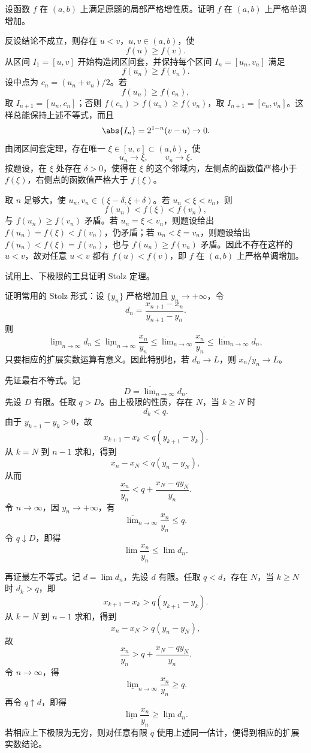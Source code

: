 \begin{xreferenceproblem}[第一组参考题 4]
设函数 $f$ 在 $(a,b)$ 上满足原题的局部严格增性质。证明 $f$ 在 $(a,b)$ 上严格单调增加。
\end{xreferenceproblem}
\begin{xsolution}
反设结论不成立，则存在 $u<v$，$u,v\in(a,b)$，使
\[
  f(u)\geqslant f(v).
\]
从区间 $I_1=[u,v]$ 开始构造闭区间套，并保持每个区间 $I_n=[u_n,v_n]$ 满足
\[
  f(u_n)\geqslant f(v_n).
\]
设中点为 $c_n=(u_n+v_n)/2$。若
\[
  f(u_n)\geqslant f(c_n),
\]
取 $I_{n+1}=[u_n,c_n]$；否则 $f(c_n)>f(u_n)\geqslant f(v_n)$，取 $I_{n+1}=[c_n,v_n]$。这样总能保持上述不等式，而且
\[
  \abs{I_n}=2^{1-n}(v-u)\to0.
\]
由闭区间套定理，存在唯一 $\xi\in[u,v]\subset(a,b)$，使
\[
  u_n\to\xi,\qquad v_n\to\xi.
\]
按题设，在 $\xi$ 处存在 $\delta>0$，使得在 $\xi$ 的这个邻域内，左侧点的函数值严格小于 $f(\xi)$，右侧点的函数值严格大于 $f(\xi)$。

取 $n$ 足够大，使 $u_n,v_n\in(\xi-\delta,\xi+\delta)$。若 $u_n<\xi<v_n$，则
\[
  f(u_n)<f(\xi)<f(v_n),
\]
与 $f(u_n)\geqslant f(v_n)$ 矛盾。若 $u_n=\xi<v_n$，则题设给出 $f(u_n)=f(\xi)<f(v_n)$，仍矛盾；若 $u_n<\xi=v_n$，则题设给出 $f(u_n)<f(\xi)=f(v_n)$，也与 $f(u_n)\geqslant f(v_n)$ 矛盾。因此不存在这样的 $u<v$，故对任意 $u<v$ 都有 $f(u)<f(v)$，即 $f$ 在 $(a,b)$ 上严格单调增加。
\end{xsolution}

\begin{xreferenceproblem}[第一组参考题 5]
试用上、下极限的工具证明 Stolz 定理。
\end{xreferenceproblem}
\begin{xsolution}
证明常用的 Stolz 形式：设 $\{y_n\}$ 严格增加且 $y_n\to+\infty$，令
\[
  d_n=\frac{x_{n+1}-x_n}{y_{n+1}-y_n}.
\]
则
\[
  \underline{\lim}_{n\to\infty}d_n
  \leqslant
  \underline{\lim}_{n\to\infty}\frac{x_n}{y_n}
  \leqslant
  \overline{\lim}_{n\to\infty}\frac{x_n}{y_n}
  \leqslant
  \overline{\lim}_{n\to\infty}d_n,
\]
只要相应的扩展实数运算有意义。因此特别地，若 $d_n\to L$，则 $x_n/y_n\to L$。

先证最右不等式。记
\[
  D=\overline{\lim}_{n\to\infty}d_n.
\]
先设 $D$ 有限。任取 $q>D$。由上极限的性质，存在 $N$，当 $k\geqslant N$ 时
\[
  d_k<q.
\]
由于 $y_{k+1}-y_k>0$，故
\[
  x_{k+1}-x_k<q(y_{k+1}-y_k).
\]
从 $k=N$ 到 $n-1$ 求和，得到
\[
  x_n-x_N<q(y_n-y_N),
\]
从而
\[
  \frac{x_n}{y_n}
  <q+\frac{x_N-qy_N}{y_n}.
\]
令 $n\to\infty$，因 $y_n\to+\infty$，有
\[
  \overline{\lim}_{n\to\infty}\frac{x_n}{y_n}\leqslant q.
\]
令 $q\downarrow D$，即得
\[
  \overline{\lim}\frac{x_n}{y_n}\leqslant\overline{\lim}d_n.
\]

再证最左不等式。记 $d=\underline{\lim}d_n$，先设 $d$ 有限。任取 $q<d$，存在 $N$，当 $k\geqslant N$ 时 $d_k>q$，即
\[
  x_{k+1}-x_k>q(y_{k+1}-y_k).
\]
从 $k=N$ 到 $n-1$ 求和，得到
\[
  x_n-x_N>q(y_n-y_N),
\]
故
\[
  \frac{x_n}{y_n}>q+\frac{x_N-qy_N}{y_n}.
\]
令 $n\to\infty$，得
\[
  \underline{\lim}_{n\to\infty}\frac{x_n}{y_n}\geqslant q.
\]
再令 $q\uparrow d$，即得
\[
  \underline{\lim}\frac{x_n}{y_n}\geqslant\underline{\lim}d_n.
\]
若相应上下极限为无穷，则对任意有限 $q$ 使用上述同一估计，便得到相应的扩展实数结论。
\end{xsolution}

